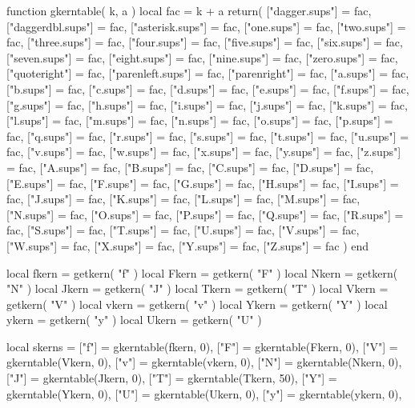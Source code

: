 \begin{luacode}
function gkerntable( k, a )
local fac = k + a
 return( { ["dagger.sups"] = fac,
  	    ["daggerdbl.sups"] = fac,
    	    ["asterisk.sups"] = fac,
            ["one.sups"] = fac,
            ["two.sups"] = fac,
	    ["three.sups"] = fac,
	    ["four.sups"] = fac,
	    ["five.sups"] = fac,
   	    ["six.sups"] = fac,
    	    ["seven.sups"] = fac,
    	    ["eight.sups"] = fac,
            ["nine.sups"] = fac,
            ["zero.sups"] = fac,
            ["quoteright"] = fac,
            ["parenleft.sups"] = fac,
            ["parenright"] = fac,
            ["a.sups"] = fac,
	    ["b.sups"] = fac,
	    ["c.sups"] = fac,
	    ["d.sups"] = fac,
   	    ["e.sups"] = fac,
    	    ["f.sups"] = fac,
    	    ["g.sups"] = fac,
            ["h.sups"] = fac,
            ["i.sups"] = fac,
            ["j.sups"] = fac,
	    ["k.sups"] = fac,
	    ["l.sups"] = fac,
	    ["m.sups"] = fac,
   	    ["n.sups"] = fac,
    	    ["o.sups"] = fac,
    	    ["p.sups"] = fac,
            ["q.sups"] = fac,
            ["r.sups"] = fac,
            ["s.sups"] = fac,
	    ["t.sups"] = fac,
            ["u.sups"] = fac,
            ["v.sups"] = fac,            
	    ["w.sups"] = fac,
	    ["x.sups"] = fac,
   	    ["y.sups"] = fac,
    	    ["z.sups"] = fac,
    	    ["A.sups"] = fac,
            ["B.sups"] = fac,
            ["C.sups"] = fac,
            ["D.sups"] = fac,
	    ["E.sups"] = fac,
	    ["F.sups"] = fac,
	    ["G.sups"] = fac,
   	    ["H.sups"] = fac,
    	    ["I.sups"] = fac,
    	    ["J.sups"] = fac,
            ["K.sups"] = fac,
            ["L.sups"] = fac,
            ["M.sups"] = fac,
	    ["N.sups"] = fac,
	    ["O.sups"] = fac,
	    ["P.sups"] = fac,
   	    ["Q.sups"] = fac,
    	    ["R.sups"] = fac,
    	    ["S.sups"] = fac,
            ["T.sups"] = fac,
            ["U.sups"] = fac,
            ["V.sups"] = fac,
	    ["W.sups"] = fac,
	    ["X.sups"] = fac,
	    ["Y.sups"] = fac,
   	    ["Z.sups"] = fac } )
end	    

local fkern = getkern( "f" )
local Fkern = getkern( "F" )
local Nkern = getkern( "N" )
local Jkern = getkern( "J" )
local Tkern = getkern( "T" )
local Vkern = getkern( "V" )
local vkern = getkern( "v" )
local Ykern = getkern( "Y" )
local ykern = getkern( "y" )
local Ukern = getkern( "U" )


local skerns = { ["f"] = gkerntable(fkern, 0),
            ["F"] = gkerntable(Fkern, 0),
            ["V"] = gkerntable(Vkern, 0),
            ["v"] = gkerntable(vkern, 0),            
            ["N"] = gkerntable(Nkern, 0),            
            ["J"] = gkerntable(Jkern, 0),            
	    ["T"] = gkerntable(Tkern, 50),
	    ["Y"] = gkerntable(Ykern, 0),
            ["U"] = gkerntable(Ukern, 0),
            ["y"] = gkerntable(ykern, 0),
 }


\end{luacode}
